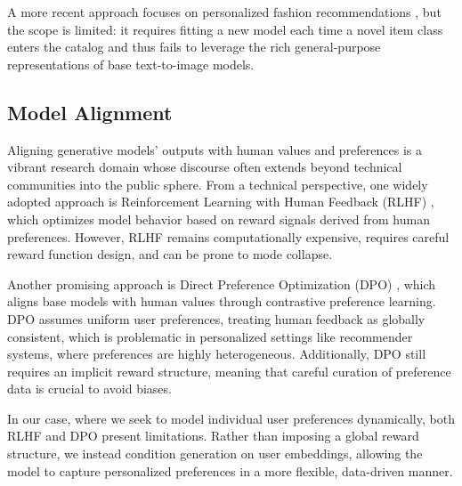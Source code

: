 A more recent approach focuses on personalized fashion recommendations \cite{genoutfit2024}, but the scope is limited: it requires fitting a new model each time a novel item class enters the catalog and thus fails to leverage the rich general-purpose representations of base text-to-image models.



\subsection{Model Alignment}

Aligning generative models' outputs with human values and preferences is a vibrant research domain whose discourse often extends beyond technical communities into the public sphere. From a technical perspective, one widely adopted approach is Reinforcement Learning with Human Feedback (RLHF) \cite{christiano2023deepreinforcementlearninghuman, ziegler2020finetuninglanguagemodelshuman}, which optimizes model behavior based on reward signals derived from human preferences. However, RLHF remains computationally expensive, requires careful reward function design, and can be prone to mode collapse.

Another promising approach is Direct Preference Optimization (DPO) \cite{rafailov2024directpreferenceoptimizationlanguage}, which aligns base models with human values through contrastive preference learning. DPO assumes uniform user preferences, treating human feedback as globally consistent, which is problematic in personalized settings like recommender systems, where preferences are highly heterogeneous. Additionally, DPO still requires an implicit reward structure, meaning that careful curation of preference data is crucial to avoid biases.

In our case, where we seek to model individual user preferences dynamically, both RLHF and DPO present limitations. Rather than imposing a global reward structure, we instead condition generation on user embeddings, allowing the model to capture personalized preferences in a more flexible, data-driven manner.

